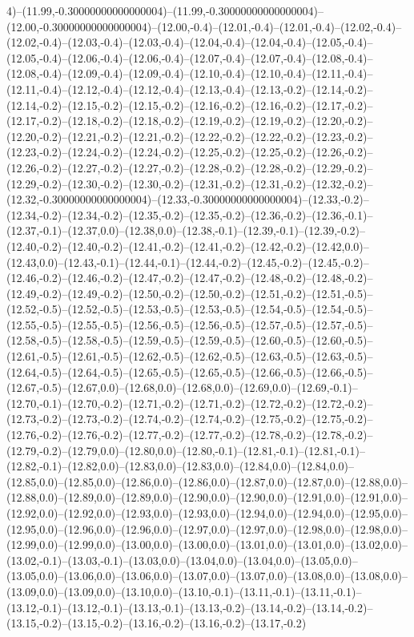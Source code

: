 4)--(11.99,-0.30000000000000004)--(11.99,-0.30000000000000004)--(12.00,-0.30000000000000004)--(12.00,-0.4)--(12.01,-0.4)--(12.01,-0.4)--(12.02,-0.4)--(12.02,-0.4)--(12.03,-0.4)--(12.03,-0.4)--(12.04,-0.4)--(12.04,-0.4)--(12.05,-0.4)--(12.05,-0.4)--(12.06,-0.4)--(12.06,-0.4)--(12.07,-0.4)--(12.07,-0.4)--(12.08,-0.4)--(12.08,-0.4)--(12.09,-0.4)--(12.09,-0.4)--(12.10,-0.4)--(12.10,-0.4)--(12.11,-0.4)--(12.11,-0.4)--(12.12,-0.4)--(12.12,-0.4)--(12.13,-0.4)--(12.13,-0.2)--(12.14,-0.2)--(12.14,-0.2)--(12.15,-0.2)--(12.15,-0.2)--(12.16,-0.2)--(12.16,-0.2)--(12.17,-0.2)--(12.17,-0.2)--(12.18,-0.2)--(12.18,-0.2)--(12.19,-0.2)--(12.19,-0.2)--(12.20,-0.2)--(12.20,-0.2)--(12.21,-0.2)--(12.21,-0.2)--(12.22,-0.2)--(12.22,-0.2)--(12.23,-0.2)--(12.23,-0.2)--(12.24,-0.2)--(12.24,-0.2)--(12.25,-0.2)--(12.25,-0.2)--(12.26,-0.2)--(12.26,-0.2)--(12.27,-0.2)--(12.27,-0.2)--(12.28,-0.2)--(12.28,-0.2)--(12.29,-0.2)--(12.29,-0.2)--(12.30,-0.2)--(12.30,-0.2)--(12.31,-0.2)--(12.31,-0.2)--(12.32,-0.2)--(12.32,-0.30000000000000004)--(12.33,-0.30000000000000004)--(12.33,-0.2)--(12.34,-0.2)--(12.34,-0.2)--(12.35,-0.2)--(12.35,-0.2)--(12.36,-0.2)--(12.36,-0.1)--(12.37,-0.1)--(12.37,0.0)--(12.38,0.0)--(12.38,-0.1)--(12.39,-0.1)--(12.39,-0.2)--(12.40,-0.2)--(12.40,-0.2)--(12.41,-0.2)--(12.41,-0.2)--(12.42,-0.2)--(12.42,0.0)--(12.43,0.0)--(12.43,-0.1)--(12.44,-0.1)--(12.44,-0.2)--(12.45,-0.2)--(12.45,-0.2)--(12.46,-0.2)--(12.46,-0.2)--(12.47,-0.2)--(12.47,-0.2)--(12.48,-0.2)--(12.48,-0.2)--(12.49,-0.2)--(12.49,-0.2)--(12.50,-0.2)--(12.50,-0.2)--(12.51,-0.2)--(12.51,-0.5)--(12.52,-0.5)--(12.52,-0.5)--(12.53,-0.5)--(12.53,-0.5)--(12.54,-0.5)--(12.54,-0.5)--(12.55,-0.5)--(12.55,-0.5)--(12.56,-0.5)--(12.56,-0.5)--(12.57,-0.5)--(12.57,-0.5)--(12.58,-0.5)--(12.58,-0.5)--(12.59,-0.5)--(12.59,-0.5)--(12.60,-0.5)--(12.60,-0.5)--(12.61,-0.5)--(12.61,-0.5)--(12.62,-0.5)--(12.62,-0.5)--(12.63,-0.5)--(12.63,-0.5)--(12.64,-0.5)--(12.64,-0.5)--(12.65,-0.5)--(12.65,-0.5)--(12.66,-0.5)--(12.66,-0.5)--(12.67,-0.5)--(12.67,0.0)--(12.68,0.0)--(12.68,0.0)--(12.69,0.0)--(12.69,-0.1)--(12.70,-0.1)--(12.70,-0.2)--(12.71,-0.2)--(12.71,-0.2)--(12.72,-0.2)--(12.72,-0.2)--(12.73,-0.2)--(12.73,-0.2)--(12.74,-0.2)--(12.74,-0.2)--(12.75,-0.2)--(12.75,-0.2)--(12.76,-0.2)--(12.76,-0.2)--(12.77,-0.2)--(12.77,-0.2)--(12.78,-0.2)--(12.78,-0.2)--(12.79,-0.2)--(12.79,0.0)--(12.80,0.0)--(12.80,-0.1)--(12.81,-0.1)--(12.81,-0.1)--(12.82,-0.1)--(12.82,0.0)--(12.83,0.0)--(12.83,0.0)--(12.84,0.0)--(12.84,0.0)--(12.85,0.0)--(12.85,0.0)--(12.86,0.0)--(12.86,0.0)--(12.87,0.0)--(12.87,0.0)--(12.88,0.0)--(12.88,0.0)--(12.89,0.0)--(12.89,0.0)--(12.90,0.0)--(12.90,0.0)--(12.91,0.0)--(12.91,0.0)--(12.92,0.0)--(12.92,0.0)--(12.93,0.0)--(12.93,0.0)--(12.94,0.0)--(12.94,0.0)--(12.95,0.0)--(12.95,0.0)--(12.96,0.0)--(12.96,0.0)--(12.97,0.0)--(12.97,0.0)--(12.98,0.0)--(12.98,0.0)--(12.99,0.0)--(12.99,0.0)--(13.00,0.0)--(13.00,0.0)--(13.01,0.0)--(13.01,0.0)--(13.02,0.0)--(13.02,-0.1)--(13.03,-0.1)--(13.03,0.0)--(13.04,0.0)--(13.04,0.0)--(13.05,0.0)--(13.05,0.0)--(13.06,0.0)--(13.06,0.0)--(13.07,0.0)--(13.07,0.0)--(13.08,0.0)--(13.08,0.0)--(13.09,0.0)--(13.09,0.0)--(13.10,0.0)--(13.10,-0.1)--(13.11,-0.1)--(13.11,-0.1)--(13.12,-0.1)--(13.12,-0.1)--(13.13,-0.1)--(13.13,-0.2)--(13.14,-0.2)--(13.14,-0.2)--(13.15,-0.2)--(13.15,-0.2)--(13.16,-0.2)--(13.16,-0.2)--(13.17,-0.2)
